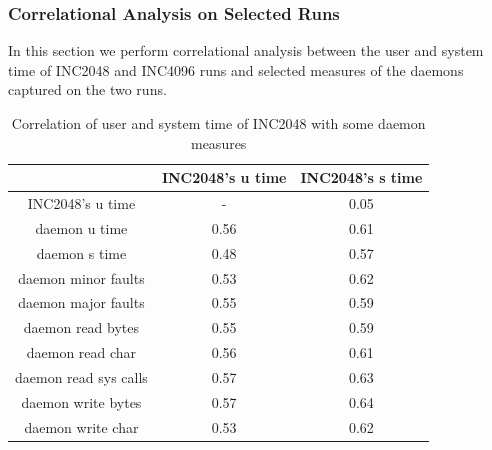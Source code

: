 \pagebreak
\clearpage

\subsubsection{Correlational Analysis on Selected Runs}
In this section we perform correlational analysis 
between the user and system time of INC2048 and INC4096 runs 
and selected measures of the daemons captured on the two runs.

\begin{table}[h]
\begin{center}
\begin{tabular}{|c|c|c|} \hline
 						   & INC2048's u time & INC2048's s time\\ \hline
INC2048's u time  &	 -  &  0.05\\ \hline					
daemon u time & 0.56 & 0.61\\ \hline
daemon s time & 0.48 & 0.57\\ \hline
daemon minor faults &  0.53 & 0.62\\ \hline
daemon major faults & 0.55 & 0.59 \\ \hline
daemon read bytes & 0.55 & 0.59 \\ \hline
daemon read char & 0.56 & 0.61\\ \hline
daemon read sys calls & 0.57 & 0.63\\ \hline
daemon write bytes & 0.57 &  0.64\\ \hline
daemon write char & 0.53 & 0.62\\ \hline
\end{tabular}
\end{center}
\vspace{-.2in}
\caption{Correlation of user and system time of INC2048 with some daemon measures\label{tab:corr_table2}}
\end{table}

